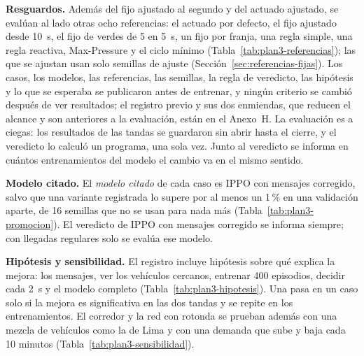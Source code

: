 \noindent\textbf{Resguardos.} Además del fijo ajustado al segundo y del
actuado ajustado, se evalúan al lado otras ocho referencias: el actuado
por defecto, el fijo ajustado desde 10~s, el fijo de verdes de 5 en
5~s, un fijo por franja, una regla simple, una regla reactiva,
Max-Pressure \citep{Varaiya2013_MaxPressure} y el ciclo mínimo
(Tabla~\ref{tab:plan3-referencias}); las que se ajustan usan solo
semillas de ajuste (Sección~\ref{sec:referencias-fijas}). Los casos, los
modelos, las referencias, las semillas, la regla de veredicto, las
hipótesis y lo que se esperaba se publicaron antes de entrenar, y
ningún criterio se cambió después de ver resultados; el registro previo
y sus dos enmiendas, que reducen el alcance y son anteriores a la
evaluación, están en el Anexo~H. La evaluación es a ciegas: los
resultados de las tandas se guardaron sin abrir hasta el cierre, y el
veredicto lo calculó un programa, una sola vez. Junto al veredicto se
informa en cuántos entrenamientos del modelo el cambio va en el mismo
sentido.

\noindent\textbf{Modelo citado.} El \emph{modelo citado} de cada caso es
IPPO con mensajes corregido, salvo que una variante registrada lo supere
por al menos un 1\,\% en una validación aparte, de 16 semillas que no se
usan para nada más (Tabla~\ref{tab:plan3-promocion}). El veredicto de IPPO con
mensajes corregido se informa siempre; con llegadas regulares solo se
evalúa ese modelo.

\noindent\textbf{Hipótesis y sensibilidad.} El registro incluye
hipótesis sobre qué explica la mejora: los mensajes, ver los vehículos
cercanos, entrenar 400 episodios, decidir cada 2~s y el modelo completo
(Tabla~\ref{tab:plan3-hipotesis}). Una pasa en un caso solo si la
mejora es significativa en las dos tandas y se repite en los
entrenamientos. El corredor y la red con rotonda se prueban además con
una mezcla de vehículos como la de Lima y con una demanda que sube y
baja cada 10 minutos (Tabla~\ref{tab:plan3-sensibilidad}).

